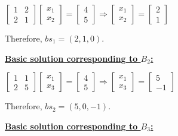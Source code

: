 \documentclass{article}
\begin{document}
\noindent
\newline
$
\begin{bmatrix}
  1 & 2 \\
  2 & 1
\end{bmatrix}
\begin{bmatrix}
  x_1 \\
  x_2
\end{bmatrix}
=
\begin{bmatrix}
 4 \\
 5 
\end{bmatrix}
\Rightarrow
\begin{bmatrix}
  x_1 \\
  x_2
\end{bmatrix}
=
\begin{bmatrix}
  2 \\
  1
\end{bmatrix}
$
\newline

\noindent
Therefore, $bs_1 = (2, 1, 0)$.
\newline

\noindent
\textbf{\underline{Basic solution corresponding to $B_2$:}}

\noindent
\newline
$
\begin{bmatrix}
  1 & 1 \\
  2 & 5
\end{bmatrix}
\begin{bmatrix}
  x_1 \\
  x_3
\end{bmatrix}
=
\begin{bmatrix}
 4 \\
 5
\end{bmatrix}
\Rightarrow
\begin{bmatrix}
  x_1 \\
  x_3
\end{bmatrix}
=
\begin{bmatrix}
  5 \\
  -1
\end{bmatrix}
$
\newline

\noindent
Therefore, $bs_2 = (5, 0, -1)$.
\newline

\noindent
\textbf{\underline{Basic solution corresponding to $B_3$:}}
\end{document}
